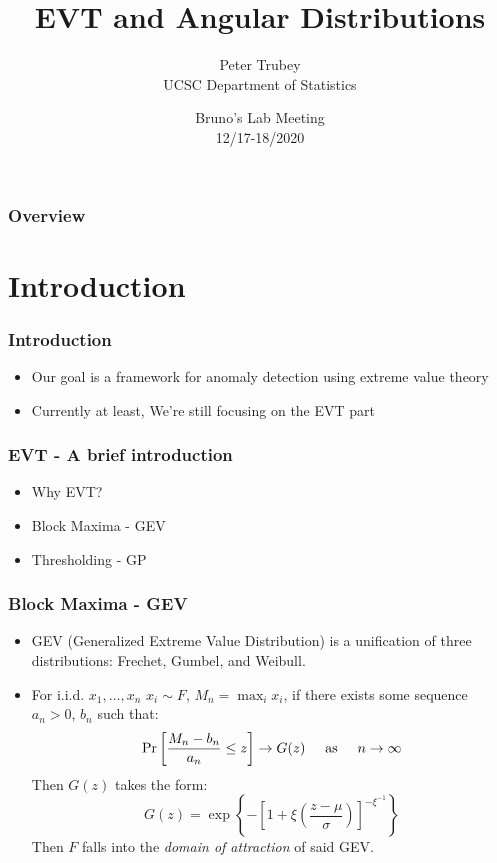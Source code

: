 \documentclass[aspectratio=169]{beamer}
\title{EVT and Angular Distributions}
\author{Peter Trubey \\ UCSC Department of Statistics}
\date[12/18/2020]{Bruno's Lab Meeting\\12/17-18/2020}
\begin{document}
\begin{frame}
  \titlepage
\end{frame}

\begin{frame}
  \frametitle{Overview}
  \tableofcontents
\end{frame}

\section{Introduction}

\begin{frame}
  \frametitle{Introduction}
  \begin{itemize}
    \item Our goal is a framework for anomaly detection using extreme value theory
    \item Currently at least, We're still focusing on the EVT part
  \end{itemize}
\end{frame}

\begin{frame}
  \frametitle{EVT - A brief introduction}
  \begin{itemize}
    \item Why EVT?
    \item Block Maxima - GEV
    \item Thresholding - GP
  \end{itemize}
\end{frame}

\begin{frame}
  \frametitle{Block Maxima - GEV}
  \begin{itemize}
    \item GEV (Generalized Extreme Value Distribution) is a unification of three distributions:
      Frechet, Gumbel, and Weibull.
    \item For i.i.d. $x_1,\ldots,x_n$ $x_i \sim F$, $M_n = \max_{i}x_i$, if there exists some
      sequence $a_n > 0$, $b_n$ such that:
      \begin{equation*}
        \text{Pr}\left[\frac{M_n - b_n}{a_n} \leq z\right]\to G(z)
          \hspace{0.5cm}\text{as}\hspace{0.5cm}n\to\infty
      \end{equation*}
      Then $G(z)$ takes the form:
      \begin{equation*}
        G(z) = \exp\left\lbrace
            -\left[1 + \xi\left(\frac{z - \mu}{\sigma}\right)\right]^{-\xi^{-1}}
            \right\rbrace
      \end{equation*}
      Then $F$ falls into the \emph{domain of attraction} of said GEV.
  \end{itemize}
\end{frame}
\end{document}
